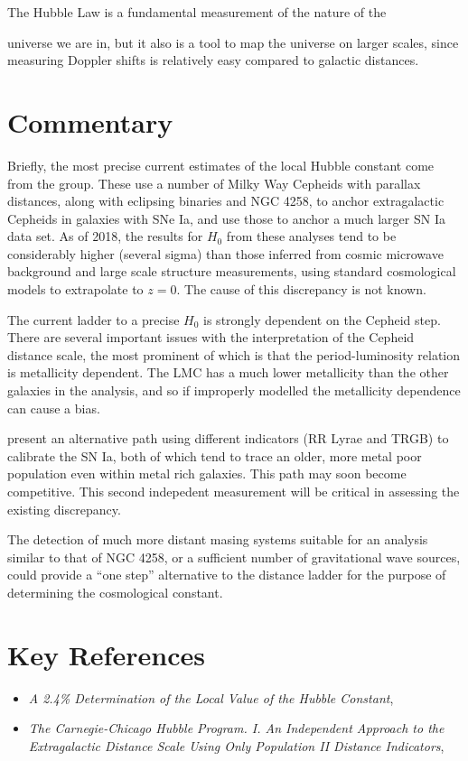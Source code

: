 The Hubble Law is a fundamental measurement of the nature of the


universe we are in, but it also is a tool to map the universe on
larger scales, since measuring Doppler shifts is relatively easy
compared to galactic distances.

\section{Commentary}

Briefly, the most precise current estimates of the local Hubble
constant come from the \citet{riess16a} group. These use a number of
Milky Way Cepheids with parallax distances, along with eclipsing
binaries and NGC 4258, to anchor extragalactic Cepheids in galaxies
with SNe Ia, and use those to anchor a much larger SN Ia data set. As
of 2018, the results for $H_0$ from these analyses tend to be
considerably higher (several sigma) than those inferred from cosmic
microwave background and large scale structure measurements, using
standard cosmological models to extrapolate to $z=0$. The cause of
this discrepancy is not known.

The current ladder to a precise $H_0$ is strongly dependent on the
Cepheid step. There are several important issues with the
interpretation of the Cepheid distance scale, the most prominent of
which is that the period-luminosity relation is metallicity
dependent. The LMC has a much lower metallicity than the other
galaxies in the analysis, and so if improperly modelled the
metallicity dependence can cause a bias.

\citet{beaton16a} present an alternative path using different
indicators (RR Lyrae and TRGB) to calibrate the SN Ia, both of which
tend to trace an older, more metal poor population even within metal
rich galaxies. This path may soon become competitive. This second
indepedent measurement will be critical in assessing the existing
discrepancy.

The detection of much more distant masing systems suitable for an
analysis similar to that of NGC 4258, or a sufficient number of
gravitational wave sources, could provide a ``one step'' alternative
to the distance ladder for the purpose of determining the cosmological
constant.

\section{Key References}

\begin{itemize}
  \item
    {\it A 2.4\% Determination of the Local Value of the Hubble
    Constant}, \citet{riess16a}
  \item
    {\it The Carnegie-Chicago Hubble Program. I. An Independent
    Approach to the Extragalactic Distance Scale Using Only Population
    II Distance Indicators}, \citet{beaton16a} 
\end{itemize}

